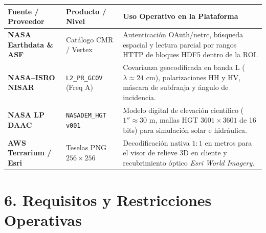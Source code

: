 \documentclass[11pt,a4paper]{article}
\begin{document}
\begin{tabularx}{\textwidth}{@{}l l X@{}}

\toprule

\textbf{Fuente / Proveedor} & \textbf{Producto / Nivel} & \textbf{Uso Operativo en la Plataforma} \\

\midrule

\textbf{NASA Earthdata \& ASF} & Cat\'alogo CMR / Vertex & Autenticaci\'on OAuth/netrc, b\'usqueda espacial y lectura parcial por rangos HTTP de bloques HDF5 dentro de la ROI. \\

\addlinespace[2pt]

\textbf{NASA--ISRO NISAR} & \texttt{L2\_PR\_GCOV} (Freq A) & Covarianza geocodificada en banda L ($\lambda \approx 24\text{ cm}$), polarizaciones HH y HV, m\'ascara de subfranja y \'angulo de incidencia. \\

\addlinespace[2pt]

\textbf{NASA LP DAAC} & \texttt{NASADEM\_HGT v001} & Modelo digital de elevaci\'on cient\'ifico ($1'' \approx 30\text{ m}$, mallas HGT $3601 \times 3601$ de 16 bits) para simulaci\'on solar e hidr\'aulica. \\

\addlinespace[2pt]

\textbf{AWS Terrarium / Esri} & Teselas PNG $256 \times 256$ & Decodificaci\'on nativa $1:1$ en metros para el visor de relieve 3D en cliente y recubrimiento \'optico \emph{Esri World Imagery}. \\

\bottomrule

\end{tabularx}

\section*{6. Requisitos y Restricciones Operativas}
\end{document}
